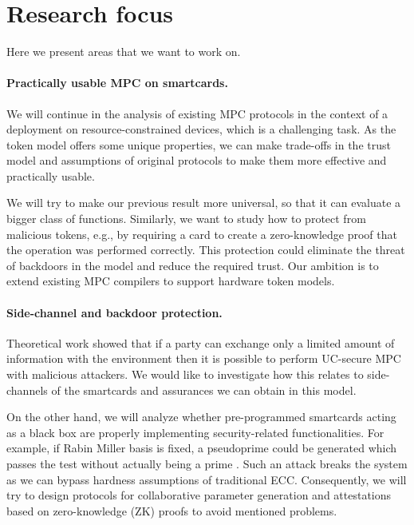 \documentclass[
  digital, %
  twoside, %
  table,   %
  lof,     %
  lot,     %
]{fithesis3}
\newcounter{ph4_show_guides}
\theoremstyle{definition}
\theoremstyle{remark}
\begin{document}
\newpage
\section{Research focus}
Here we present areas that we want to work on.

\paragraph{Practically usable MPC on smartcards.}%
We will continue in the analysis of existing MPC protocols in the context of a deployment on resource-constrained devices, which is a challenging task.
As the token model offers some unique properties, we can make trade-offs in the trust model and assumptions of original protocols to make them more effective and practically usable. 

We will try to make our previous result \cite{2017-ccs-mavroudis} more universal, so that it can evaluate a bigger class of functions. Similarly, we want to study how to protect from malicious tokens, e.g., by requiring a card to create a zero-knowledge proof that the operation was performed correctly.  This protection could eliminate the threat of backdoors in the model and reduce the required trust.
Our ambition is to extend existing MPC compilers to support hardware token models.

\paragraph{Side-channel and backdoor protection.}%
Theoretical work \cite{DNW09} showed that if a party can exchange only a limited amount of information with the environment then it is possible to perform UC-secure MPC with malicious attackers. We would like to investigate how this relates to side-channels of the smartcards and assurances we can obtain in this model.

On the other hand, we will analyze whether pre-programmed smartcards acting as a black box are properly implementing security-related functionalities. For example, if Rabin Miller basis is fixed, a pseudoprime could be generated which passes the test without actually being a prime \cite{10.1007/978-3-540-30580-4_2}. Such an attack breaks the system as we can bypass hardness assumptions of traditional ECC. Consequently, we will try to design protocols for collaborative parameter generation and attestations based on zero-knowledge (ZK) proofs to avoid mentioned problems.
\end{document}
